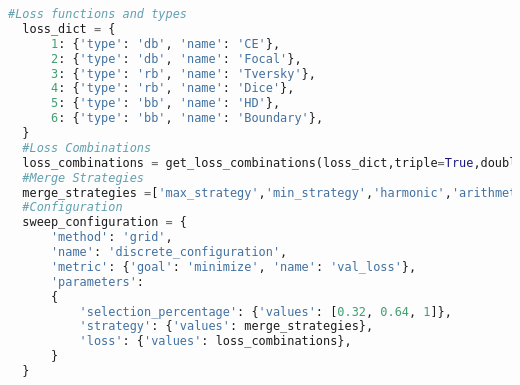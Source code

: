 \begin{lstlisting}[style=mystyle,language=Python, numbers=none, caption={The discrete sweep configuration setup is composed of a dictionary that includes six loss functions, along with their corresponding types. This dictionary is provided to the \texttt{get\_loss\_combinations} function, which generates a list of 20 double and triple loss combinations, as previously introduced in \ref{tab:loss_combinations}. Moreover, the configuration encompasses six merge strategies, excluding time-based and performance-based strategies. Both the loss combinations and merge strategies are then incorporated into the sweep configuration dictionary, which creates one run for each combination. The objective of this configuration is to minimize validation loss. It is important to note that this configuration does not have any specific hyperparameter set, creating $20\cdot 6 \cdot 3=360$ distinct models.}]
  #Loss functions and types
  loss_dict = {
      1: {'type': 'db', 'name': 'CE'},
      2: {'type': 'db', 'name': 'Focal'},
      3: {'type': 'rb', 'name': 'Tversky'},
      4: {'type': 'rb', 'name': 'Dice'},
      5: {'type': 'bb', 'name': 'HD'},
      6: {'type': 'bb', 'name': 'Boundary'},
  }
  #Loss Combinations
  loss_combinations = get_loss_combinations(loss_dict,triple=True,double=True,baseline=False)
  #Merge Strategies
  merge_strategies =['max_strategy','min_strategy','harmonic','arithmetic','weighted_sum','normalized_weighted_sum']
  #Configuration
  sweep_configuration = {
      'method': 'grid',
      'name': 'discrete_configuration',
      'metric': {'goal': 'minimize', 'name': 'val_loss'},
      'parameters':
      {   
          'selection_percentage': {'values': [0.32, 0.64, 1]},
          'strategy': {'values': merge_strategies},
          'loss': {'values': loss_combinations},
      }
  }
\end{lstlisting}

